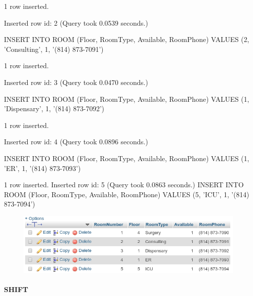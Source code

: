 \documentclass[11pt]{article}
\makeatletter
\def\maxwidth{\ifdim\Gin@nat@width>\linewidth\linewidth
    \else\Gin@nat@width\fi}
\let\Oldincludegraphics\includegraphics
\renewcommand{\includegraphics}[1]{\Oldincludegraphics[width=.8\maxwidth]{#1}}
\makeatother
\begin{document}
1 row inserted.

Inserted row id: 2 (Query took 0.0539 seconds.)

INSERT INTO ROOM (Floor, RoomType, Available, RoomPhone) VALUES (2,
'Consulting', 1, '(814) 873-7091')

1 row inserted.

Inserted row id: 3 (Query took 0.0470 seconds.)

INSERT INTO ROOM (Floor, RoomType, Available, RoomPhone) VALUES (1,
'Dispensary', 1, '(814) 873-7092')

1 row inserted.

Inserted row id: 4 (Query took 0.0896 seconds.)

INSERT INTO ROOM (Floor, RoomType, Available, RoomPhone) VALUES (1,
'ER', 1, '(814) 873-7093')

1 row inserted. Inserted row id: 5 (Query took 0.0863 seconds.) INSERT
INTO ROOM (Floor, RoomType, Available, RoomPhone) VALUES (5, 'ICU', 1,
'(814) 873-7094')

    \begin{figure}[H]
\centering
\includegraphics{ROOM_2.png}
\caption{}
\end{figure}

    \paragraph{SHIFT}\label{shift}
\end{document}
